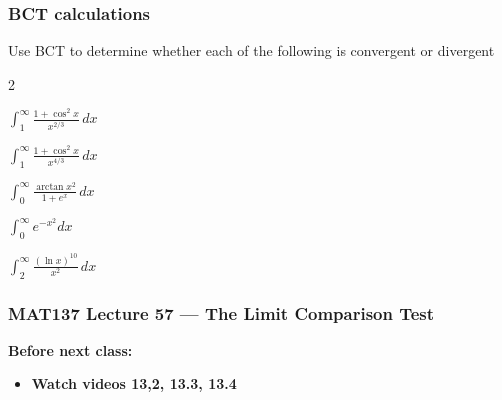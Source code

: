 \documentclass[14pt]{beamer}
\newcommand{\p}{\pause}
\begin{document}
	\begin{frame}[t]
		\frametitle{BCT calculations}

		Use BCT to determine whether each of the following is convergent or
		divergent

		\begin{enumerate}
		\end{enumerate}
	\end{frame}






\begin{frame}
	\frametitle{MAT137 Lecture 57 --- The Limit Comparison Test}

	\vfill
	{\bf Before next class:}
		\begin{itemize} \normalsize
			\item {\bf Watch videos 13,2, 13.3, 13.4 }
		\end{itemize}
\end{frame}
\end{document}
